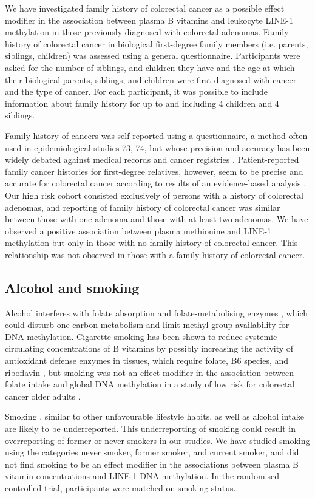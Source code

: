 \noindent We have investigated family history of colorectal cancer as a possible effect modifier in the association between plasma B vitamins and leukocyte LINE-1 methylation in those previously diagnosed with colorectal adenomas. Family history of colorectal cancer in biological first-degree family members (i.e. parents, siblings, children) was assessed using a general questionnaire. Participants were asked for the number of siblings, and children they have and the age at which their biological parents, siblings, and children were first diagnosed with cancer and the type of cancer. For each participant, it was possible to include information about family history for up to and including 4 children and 4 siblings. 
 
\noindent Family history of cancers was self-reported using a questionnaire, a method often used in epidemiological studies 73, 74, but whose precision and accuracy has been widely debated against medical records and cancer registries \cite{c775,c776,c777}. Patient-reported family cancer histories for first-degree relatives, however, seem to be precise and accurate for colorectal cancer according to results of an evidence-based analysis \cite{c778}. Our high risk cohort consisted exclusively of persons with a history of colorectal adenomas, and reporting of family history of colorectal cancer was similar between those with one adenoma and those with at least two adenomas. We have observed a positive association between plasma methionine and LINE-1 methylation but only in those with no family history of colorectal cancer. This relationship was not observed in those with a family history of colorectal cancer. 
 
\subsection{Alcohol and smoking} %
Alcohol interferes with folate absorption and folate-metabolising enzymes \cite{c779}, which could disturb one-carbon metabolism and limit methyl group availability for DNA methylation. Cigarette smoking has been shown to reduce systemic circulating concentrations of B vitamins by possibly increasing the activity of antioxidant defense enzymes in tissues, which require folate, B6 species, and riboflavin \cite{c780}, but smoking was not an effect modifier in the association between folate intake and global DNA methylation in a study of low risk for colorectal cancer older adults \cite{c79}. 
 
\noindent Smoking \cite{c781}, similar to other unfavourable lifestyle habits, as well as alcohol intake \cite{c782} are likely to be underreported. This underreporting of smoking could result in overreporting of former or never smokers in our studies. We have studied smoking using the categories never smoker, former smoker, and current smoker, and did not find smoking to be an effect modifier in the associations between plasma B vitamin concentrations and LINE-1 DNA methylation. In the randomised-controlled trial, participants were matched on smoking status. 
 
